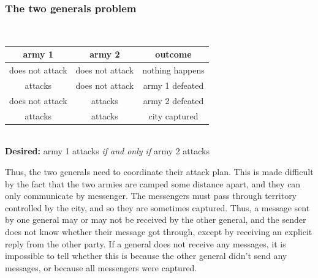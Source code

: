 \begin{frame}
    \label{s:two-generals}
    \frametitle{The two generals problem}
    \begin{center}
        \\[1em]\pause
        \renewcommand{\arraystretch}{1.3}
        \begin{tabular}{c|c|c}
            \hline
            \textbf{army 1} & \textbf{army 2} & \textbf{outcome} \\\hline
            does not attack & does not attack & nothing happens \\
            attacks & does not attack & army 1 defeated \\
            does not attack & attacks & army 2 defeated \\
            attacks & attacks & city captured \\\hline
        \end{tabular}\\[1em]
        \textbf{Desired:} army 1 attacks \emph{if and only if} army 2 attacks
    \end{center}
\end{frame}
\label{l:two-generals}

Thus, the two generals need to coordinate their attack plan.
This is made difficult by the fact that the two armies are camped some distance apart, and they can only communicate by messenger.
The messengers must pass through territory controlled by the city, and so they are sometimes captured.
Thus, a message sent by one general may or may not be received by the other general, and the sender does not know whether their message got through, except by receiving an explicit reply from the other party.
If a general does not receive any messages, it is impossible to tell whether this is because the other general didn't send any messages, or because all messengers were captured.

